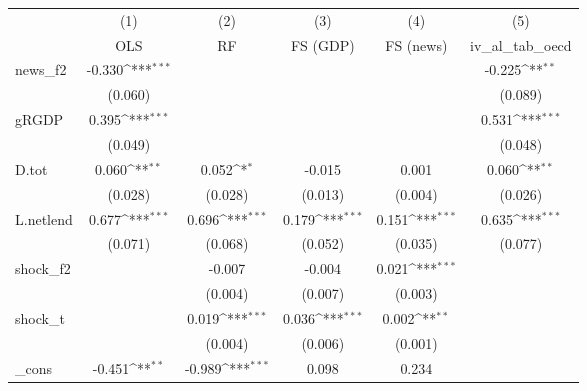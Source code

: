 {
\def\sym#1{\ifmmode^{#1}\else\(^{#1}\)\fi}
\begin{tabular}{l*{5}{c}}
\toprule
            &\multicolumn{1}{c}{(1)}&\multicolumn{1}{c}{(2)}&\multicolumn{1}{c}{(3)}&\multicolumn{1}{c}{(4)}&\multicolumn{1}{c}{(5)}\\
            &\multicolumn{1}{c}{OLS}&\multicolumn{1}{c}{RF}&\multicolumn{1}{c}{FS (GDP)}&\multicolumn{1}{c}{FS (news)}&\multicolumn{1}{c}{iv\_al\_tab\_oecd}\\
\midrule
news\_f2     &      -0.330\sym{***}&                     &                     &                     &      -0.225\sym{**} \\
            &     (0.060)         &                     &                     &                     &     (0.089)         \\
\addlinespace
gRGDP       &       0.395\sym{***}&                     &                     &                     &       0.531\sym{***}\\
            &     (0.049)         &                     &                     &                     &     (0.048)         \\
\addlinespace
D.tot       &       0.060\sym{**} &       0.052\sym{*}  &      -0.015         &       0.001         &       0.060\sym{**} \\
            &     (0.028)         &     (0.028)         &     (0.013)         &     (0.004)         &     (0.026)         \\
\addlinespace
L.netlend   &       0.677\sym{***}&       0.696\sym{***}&       0.179\sym{***}&       0.151\sym{***}&       0.635\sym{***}\\
            &     (0.071)         &     (0.068)         &     (0.052)         &     (0.035)         &     (0.077)         \\
\addlinespace
shock\_f2    &                     &      -0.007         &      -0.004         &       0.021\sym{***}&                     \\
            &                     &     (0.004)         &     (0.007)         &     (0.003)         &                     \\
\addlinespace
shock\_t     &                     &       0.019\sym{***}&       0.036\sym{***}&       0.002\sym{**} &                     \\
            &                     &     (0.004)         &     (0.006)         &     (0.001)         &                     \\
\addlinespace
\_cons      &      -0.451\sym{**} &      -0.989\sym{***}&       0.098         &       0.234         &                     \\

\end{tabular}}
